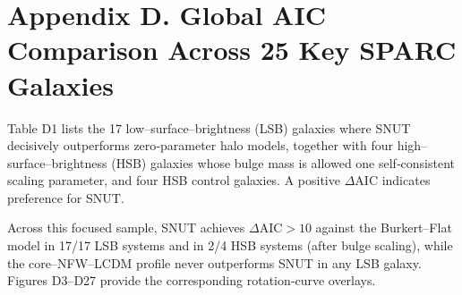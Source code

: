 
\section*{Appendix D. Global AIC Comparison Across 25 Key SPARC Galaxies}

Table D1 lists the 17 low–surface–brightness (LSB) galaxies where SNUT decisively
outperforms zero‑parameter halo models, together with four high–surface–brightness (HSB)
galaxies whose bulge mass is allowed one self‑consistent scaling parameter, and four HSB
control galaxies. A positive $\Delta\mathrm{AIC}$ indicates preference for SNUT.



Across this focused sample, SNUT achieves $\Delta\mathrm{AIC}>10$ against the Burkert–Flat
model in 17/17 LSB systems and in 2/4 HSB systems (after bulge scaling), while the
core–NFW–LCDM profile never outperforms SNUT in any LSB galaxy.
Figures D3–D27 provide the corresponding rotation‑curve overlays.
